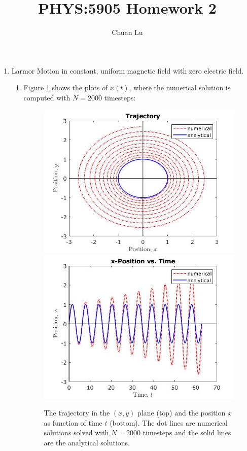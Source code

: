 \documentclass{article}
\begin{document}
\author{Chuan Lu}
\title{PHYS:5905 Homework 2}
\maketitle

\medskip

\begin{enumerate}

\item
Larmor Motion in constant, uniform magnetic field with zero electric field.

\begin{enumerate}
\item
Figure \ref{problem 1.1} shows the plots of $x(t)$, where the numerical solution is computed with $N=2000$ timesteps:
\begin{figure}[htbp]
\centering
\vbox{
\includegraphics[scale=0.6]{problem1/trajectory_timestep_2000.jpg}
\includegraphics[scale=0.6]{problem1/xposition_timestep_2000.jpg}
}
\caption{The trajectory in the $(x, y)$ plane (top) and the position $x$ as function of time $t$ (bottom). The dot lines are numerical solutions solved with $N=2000$ timesteps and the solid lines are the analytical solutions.}
\label{problem 1.1}
\end{figure}


\end{enumerate}
\end{enumerate}
\end{document}
